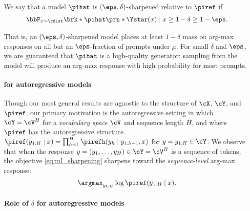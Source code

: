                                                      \begin{definition}
                                                       \label{def:sharpening}
    We say that a model $\pihat$ is $(\eps,\delta)$-sharpened
    relative to $\piref$ if
    \begin{align}
      \bbP_{x\sim\cdist}\brk*{\pihat\prn*{\Ystar(x)\mid{}x}\geq{}1-\delta} \geq{} 1-\eps.
    \end{align}
  \end{definition}
That is, an $(\eps,\delta)$-sharpened model places at least
$1-\delta$ mass on arg-max responses on all but an $\eps$-fraction
of prompts under $\mu$. For small $\delta$ and $\eps$, we are
guaranteed that $\pihat$ is a high-quality generator: sampling from the model will produce an arg-max
response with high probability for most prompts.







  \paragraph{\Mlsharp for autoregressive models}
  Though our most general results are
  agnostic to the structure of $\cX$, $\cY$, and $\piref$, our primary
  motivation is
the autoregressive setting in which
$\cY=\cV^{H}$ for a \emph{vocabulary space} $\cV$ and sequence
  length $H$, and where $\piref$ has the autoregressive structure
$\piref(y_{1:H}\mid{}x)=\prod_{h=1}^{H}\pirefh(y_h\mid{}y_{1:h-1},x)$
for $y=y_{1:H}\in\cY$.
We observe
that when the response
$y=(y_1,\ldots,y_H)\in\cY=\cV^{H}$ is a sequence of tokens, the
\mlsharp objective \eqref{eq:ml_sharpening} sharpens
toward the \emph{sequence-level} arg-max response:
\begin{align}
  \label{eq:inference_time}
\argmax_{y_{1:H}}\log\piref(y_{1:H}\mid{}x).
\end{align}


  


  \loose

  \paragraph{Role of $\delta$ for autoregressive models}


